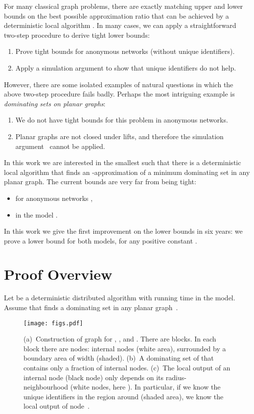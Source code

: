\documentclass[11pt,a4paper]{article}
\theoremstyle{definition}
\begin{document}
For many classical graph problems, there are exactly matching upper and lower bounds on the best possible approximation ratio that can be achieved by a deterministic local algorithm \cite{suomela13survey}. In many cases, we can apply a straightforward two-step procedure to derive tight lower bounds:
\begin{enumerate}[noitemsep]
    \item Prove tight bounds for anonymous networks (without unique identifiers).
    \item Apply a simulation argument \cite{goos13local-approximation} to show that unique identifiers do not help.
\end{enumerate}
However, there are some isolated examples of natural questions in which the above two-step procedure fails badly. Perhaps the most intriguing example is \emph{dominating sets on planar graphs}:
\begin{enumerate}[noitemsep]
    \item We do not have tight bounds for this problem in anonymous networks.
    \item Planar graphs are not closed under lifts, and therefore the simulation argument~\cite{goos13local-approximation} cannot be applied.
\end{enumerate}
In this work we are interested in the smallest  such that there is a deterministic local algorithm that finds an -approximation of a minimum dominating set in any planar graph. The current bounds are very far from being tight:
\begin{itemize}[noitemsep]
    \item  for anonymous networks \cite{czygrinow08fast,wawrzyniak13mds-brief},
    \item  in the  model \cite{czygrinow08fast,lenzen11phd,lenzen13mds,wawrzyniak14mds-analysis}.
\end{itemize}
In this work we give the first improvement on the lower bounds in six years: we prove a lower bound  for both models, for any positive constant .


\section{Proof Overview}

Let  be a deterministic distributed algorithm with running time  in the  model. Assume that  finds a dominating set  in any planar graph~.

\begin{SCfigure}
\texttt{[image: figs.pdf]}
\caption{(a)~Construction of graph  for , , and . There are  blocks. In each block there are  nodes:  internal nodes (white area), surrounded by a boundary area of width  (shaded). (b)~A dominating set  of  that contains only a fraction  of internal nodes. (c)~The local output of an internal node  (black node) only depends on its radius- neighbourhood (white nodes, here ). In particular, if we know the unique identifiers in the  region  around  (shaded area), we know the local output of node~.}\label{fig:G}
\end{SCfigure}
\end{document}
